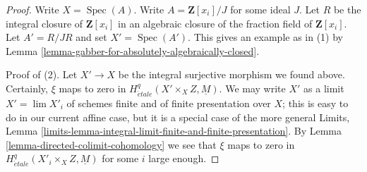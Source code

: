 \documentclass[10pt,a4paper]{amsart}
\theoremstyle{plain}
\theoremstyle{definition}
\theoremstyle{remark}
\numberwithin{equation}{subsection}
\def\lim{\mathop{\mathrm{lim}}\nolimits}
\def\Spec{\mathop{\mathrm{Spec}}}
\def\etale{{\acute{e}tale}}
\begin{document}
\begin{proof}
Write $X = \Spec(A)$. Write $A = \mathbf{Z}[x_i]/J$ for some ideal $J$.
Let $R$ be the integral closure of $\mathbf{Z}[x_i]$ in an algebraic
closure of the fraction field of $\mathbf{Z}[x_i]$. Let
$A' = R/JR$ and set $X' = \Spec(A')$. This gives an example as in (1) by
Lemma \ref{lemma-gabber-for-absolutely-algebraically-closed}.

\medskip\noindent
Proof of (2). Let $X' \to X$ be the integral surjective morphism we found
above. Certainly, $\xi$ maps to zero in
$H^q_\etale(X' \times_X Z, \underline{M})$. We may write $X'$ as a
limit $X' = \lim X'_i$ of schemes finite and of finite presentation
over $X$; this is easy to do in our current affine case, but it
is a special case of the more general Limits, Lemma
\ref{limits-lemma-integral-limit-finite-and-finite-presentation}.
By Lemma \ref{lemma-directed-colimit-cohomology}
we see that $\xi$ maps to zero in $H^q_\etale(X'_i \times_X Z, \underline{M})$
for some $i$ large enough.
\end{proof}
\end{document}

